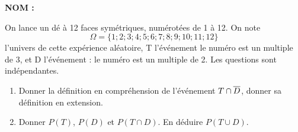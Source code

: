 \documentclass[a4paper,11pt,DIV15,BCOR0mm]{scrartcl}
\begin{document}
\newcommand{\vv}[1]{\vect{#1}}
\noindent\textbf{NOM : }

\begin{exercice}
On lance un dé à 12 faces symétriques, numérotées de 1 à 12. 
On note \[\Omega=\{1;2;3;4;5;6;7;8;9;10;11;12\}\]
l'univers de cette expérience aléatoire, T l'événement \og le numéro est
un multiple de 3\fg, et D l'événement : \og le numéro est un multiple de 2\fg.
Les questions sont indépendantes.
\begin{enumerate}
 \item Donner la définition en compréhension de l'événement $T\cap\overline{D}$, donner sa définition en extension.
 \vfill
 \item Donner $P(T)$, $P(D)$ et $P(T\cap D)$. En déduire $P(T\cup D)$.
 \vfill
\end{enumerate}
\end{exercice}
\end{document}
